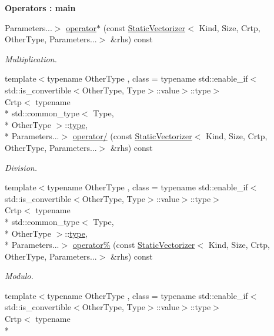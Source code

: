 \begin{Indent}{\bf Operators \-: main}
\begin{DoxyCompactItemize}
Parameters...$>$ \hyperlink{classmagrathea_1_1StaticVectorizer_a915d0b7778501174f122a8497fb46387}{operator$\ast$} (const \hyperlink{classmagrathea_1_1StaticVectorizer}{Static\-Vectorizer}$<$ Kind, Size, Crtp, Other\-Type, Parameters...$>$ \&rhs) const 
\begin{DoxyCompactList}\small\item\em Multiplication. \end{DoxyCompactList}\item 
{\footnotesize template$<$typename Other\-Type , class  = typename std\-::enable\-\_\-if$<$std\-::is\-\_\-convertible$<$\-Other\-Type, Type$>$\-::value$>$\-::type$>$ }\\Crtp$<$ typename \\*
std\-::common\-\_\-type$<$ Type, \\*
Other\-Type $>$\-::\hyperlink{classmagrathea_1_1StaticVectorizer_a28c393a3896a3e839008c35d56b10a54}{type}, \\*
Parameters...$>$ \hyperlink{classmagrathea_1_1StaticVectorizer_a37c01771117232fb2ba44a73682f7d2d}{operator/} (const \hyperlink{classmagrathea_1_1StaticVectorizer}{Static\-Vectorizer}$<$ Kind, Size, Crtp, Other\-Type, Parameters...$>$ \&rhs) const 
\begin{DoxyCompactList}\small\item\em Division. \end{DoxyCompactList}\item 
{\footnotesize template$<$typename Other\-Type , class  = typename std\-::enable\-\_\-if$<$std\-::is\-\_\-convertible$<$\-Other\-Type, Type$>$\-::value$>$\-::type$>$ }\\Crtp$<$ typename \\*
std\-::common\-\_\-type$<$ Type, \\*
Other\-Type $>$\-::\hyperlink{classmagrathea_1_1StaticVectorizer_a28c393a3896a3e839008c35d56b10a54}{type}, \\*
Parameters...$>$ \hyperlink{classmagrathea_1_1StaticVectorizer_add2236077d26b29ce7b03a3990d4f16e}{operator\%} (const \hyperlink{classmagrathea_1_1StaticVectorizer}{Static\-Vectorizer}$<$ Kind, Size, Crtp, Other\-Type, Parameters...$>$ \&rhs) const 
\begin{DoxyCompactList}\small\item\em Modulo. \end{DoxyCompactList}\item 
{\footnotesize template$<$typename Other\-Type , class  = typename std\-::enable\-\_\-if$<$std\-::is\-\_\-convertible$<$\-Other\-Type, Type$>$\-::value$>$\-::type$>$ }\\Crtp$<$ typename \\*

\end{DoxyCompactItemize}
\end{Indent}
